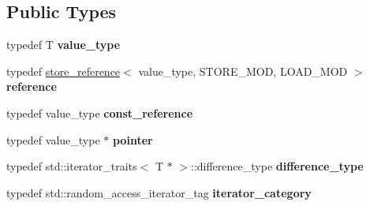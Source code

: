 \subsection*{Public Types}
\begin{DoxyCompactItemize}
\item 
\mbox{\label{structcugar_1_1cuda_1_1store__pointer_a0dd20abccec5ba63af52e551ecfa8375}} 
typedef T {\bfseries value\+\_\+type}
\item 
\mbox{\label{structcugar_1_1cuda_1_1store__pointer_ad7a67bfcdcece8bff16e805009bcd518}} 
typedef \hyperlink{structcugar_1_1cuda_1_1store__reference}{store\+\_\+reference}$<$ value\+\_\+type, S\+T\+O\+R\+E\+\_\+\+M\+OD, L\+O\+A\+D\+\_\+\+M\+OD $>$ {\bfseries reference}
\item 
\mbox{\label{structcugar_1_1cuda_1_1store__pointer_a4c7f08792c120e007cf85866c0769a93}} 
typedef value\+\_\+type {\bfseries const\+\_\+reference}
\item 
\mbox{\label{structcugar_1_1cuda_1_1store__pointer_a783b69bfddd6b07b2e02216c109fabdc}} 
typedef value\+\_\+type $\ast$ {\bfseries pointer}
\item 
\mbox{\label{structcugar_1_1cuda_1_1store__pointer_a3b75ea2a2e4d81fb01c4b29b6676ad8d}} 
typedef std\+::iterator\+\_\+traits$<$ T $\ast$ $>$\+::difference\+\_\+type {\bfseries difference\+\_\+type}
\item 
\mbox{\label{structcugar_1_1cuda_1_1store__pointer_aa4d6cf3bbc6e3beb86aa6badc441e387}} 
typedef std\+::random\+\_\+access\+\_\+iterator\+\_\+tag {\bfseries iterator\+\_\+category}
\end{DoxyCompactItemize}

